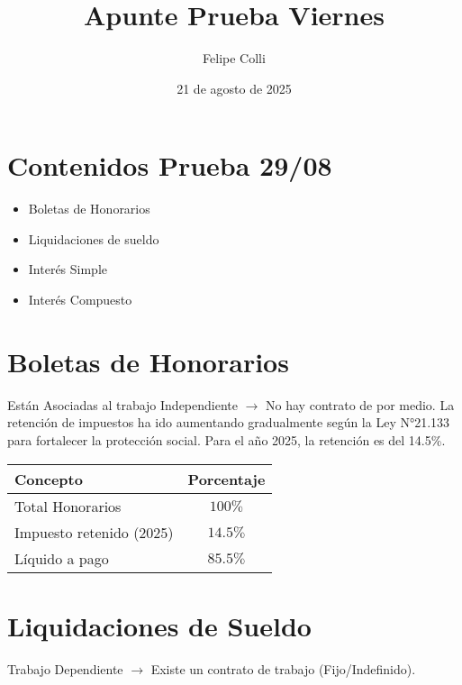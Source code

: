\documentclass[11pt]{article}
\title{Apunte Prueba Viernes}
\author{Felipe Colli}
\date{21 de agosto de 2025}
\begin{document}
\maketitle

\section{Contenidos Prueba 29/08}
\begin{itemize}
    \item Boletas de Honorarios
    \item Liquidaciones de sueldo
    \item Interés Simple
    \item Interés Compuesto
\end{itemize}

\section{Boletas de Honorarios}
Están Asociadas al trabajo Independiente $\rightarrow$ No hay contrato de por medio. La retención de impuestos ha ido aumentando gradualmente según la Ley N°21.133 para fortalecer la protección social. Para el año 2025, la retención es del 14.5\%.

\begin{table}[h!]
\centering
\begin{tabular}{|l|c|}
    \hline
    \textbf{Concepto} & \textbf{Porcentaje} \\ 
    \hline
    Total Honorarios & $100\%$ \\ 
    \hline
    Impuesto retenido (2025) & $14.5\%$ \\
    \hline
    Líquido a pago & $85.5\%$ \\
    \hline
\end{tabular}
\end{table}

\section{Liquidaciones de Sueldo}
Trabajo Dependiente $\rightarrow$ Existe un contrato de trabajo (Fijo/Indefinido).
\end{document}
